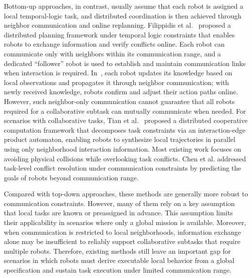 \documentclass[lettersize,journal]{IEEEtran}
\begin{document}
Bottom-up approaches, in contrast, usually assume that each robot is assigned a local temporal-logic task, and distributed coordination is then achieved through neighbor communication and online replanning. Filippidis et al.~\cite{6426027} proposed a distributed planning framework under temporal logic constraints that enables robots to exchange information and verify conflicts online. Each robot can communicate only with neighbors within its communication range, and a dedicated ``follower'' robot is used to establish and maintain communication links when interaction is required. In~\cite{guo2015multi,6907485}, each robot updates its knowledge based on local observations and propagates it through neighbor communication; with newly received knowledge, robots confirm and adjust their action paths online. However, such neighbor-only communication cannot guarantee that all robots required for a collaborative subtask can mutually communicate when needed. For scenarios with collaborative tasks, Tian et al.~\cite{tian2021decentralized} proposed a distributed cooperative computation framework that decomposes task constraints via an interaction-edge product automaton, enabling robots to synthesize local trajectories in parallel using only neighborhood interaction information.
Most existing work focuses on avoiding physical collisions while overlooking task conflicts. Chen et al. \cite{chen2024distributed} addressed task-level conflict resolution under communication constraints by predicting the goals of robots beyond communication range.

Compared with top-down approaches, these methods are generally more robust to communication constraints. However, many of them rely on a key assumption that local tasks are known or preassigned in advance. This assumption limits their applicability in scenarios where only a global mission is available. Moreover, when communication is restricted to local neighborhoods, information exchange alone may be insufficient to reliably support collaborative subtasks that require multiple robots. Therefore, existing methods still leave an important gap for scenarios in which robots must derive executable local behavior from a global specification and sustain task execution under limited communication range.
\end{document}
